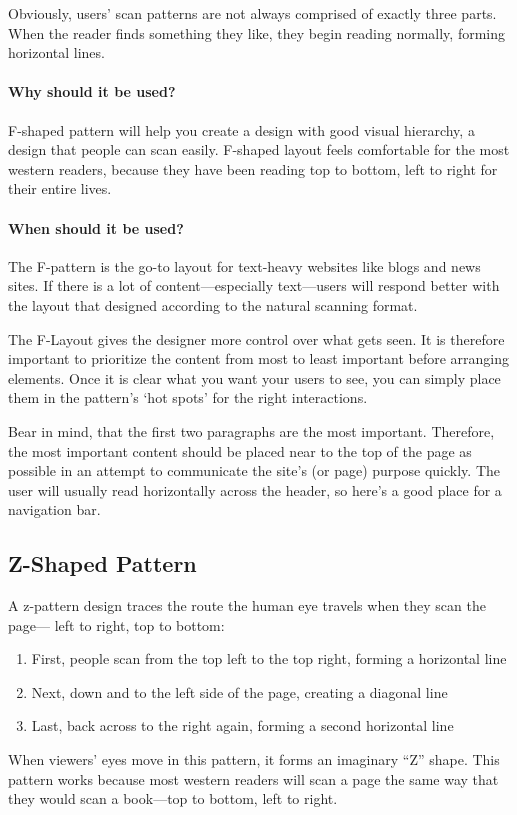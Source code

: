Obviously, users’ scan patterns are not always comprised of exactly three parts. When the reader finds something they like, they begin reading normally, forming horizontal lines.

\paragraph{Why should it be used?}
F-shaped pattern will help you create a design with good visual hierarchy, a design that people can scan easily. F-shaped layout feels comfortable for the most western readers, because they have been reading top to bottom, left to right for their entire lives.

\paragraph{When should it be used?}
The F-pattern is the go-to layout for text-heavy websites like blogs and news sites. If there is a lot of content---especially text---users will respond better with the layout that designed according to the natural scanning format.


The F-Layout gives the designer more control over what gets seen.
It is therefore important to prioritize the content from most to least important before arranging elements. Once it is clear what you want your users to see, you can simply place them in the pattern’s ‘hot spots’ for the right interactions.

Bear in mind, that the first two paragraphs are the most important. 
Therefore, the most important content should be placed near to the top of the page as possible in an attempt to communicate the site’s (or page) purpose quickly. The user will usually read horizontally across the header, so here’s a good place for a navigation bar.


\subsection{Z-Shaped Pattern} %
\label{sub:z_shaped_pattern}

A z-pattern design traces the route the human eye travels when they scan the page— left to right, top to bottom:
\begin{enumerate}
	\item First, people scan from the top left to the top right, forming a horizontal line
	\item Next, down and to the left side of the page, creating a diagonal line
	\item Last, back across to the right again, forming a second horizontal line
\end{enumerate}
When viewers’ eyes move in this pattern, it forms an imaginary ``Z'' shape.
This pattern works because most western readers will scan a page the same way that they would scan a book---top to bottom, left to right.

